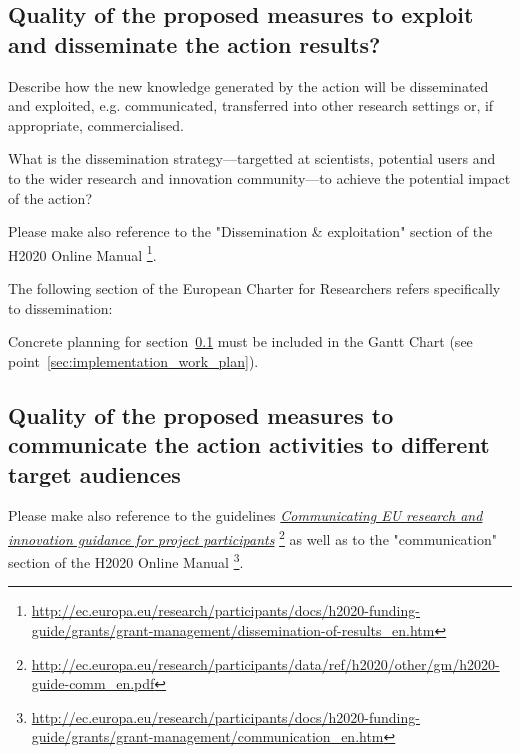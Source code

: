 \subsection{Quality of the proposed measures to exploit and disseminate the action results?}
\label{sec:impact_dissemination}

Describe how the new knowledge generated by the action will be disseminated and exploited, 
e.g. communicated, transferred into other research settings or, if appropriate, commercialised.

\medskip\noindent
What is the dissemination strategy\----targetted at scientists, potential users and to the wider research and innovation community\----to achieve the potential impact of the action?

\medskip\noindent
Please make also reference to the "Dissemination \& exploitation" section of the H2020 Online Manual%
\footnote{\url{http://ec.europa.eu/research/participants/docs/h2020-funding-guide/grants/grant-management/dissemination-of-results_en.htm}}.

\medskip\noindent
The following section of the European Charter for Researchers refers specifically to dissemination: 

\bigskip\noindent
\setlength{\fboxsep}{3mm}

\medskip\noindent
Concrete planning for section~\ref{sec:impact_dissemination} must be included in the Gantt Chart (see point~\ref{sec:implementation_work_plan}).




\subsection{Quality of the proposed measures to communicate the action activities to different target audiences}
\label{sec:impact_communication}

Please make also reference to the guidelines {\em \href{http://ec.europa.eu/research/participants/data/ref/h2020/other/gm/h2020-guide-comm_en.pdf}{Communicating EU research and innovation guidance for project participants}}%
\footnote{\url{http://ec.europa.eu/research/participants/data/ref/h2020/other/gm/h2020-guide-comm_en.pdf}} 
as well as to the "communication" section of the H2020 Online Manual%
\footnote{\url{http://ec.europa.eu/research/participants/docs/h2020-funding-guide/grants/grant-management/communication_en.htm}}.

